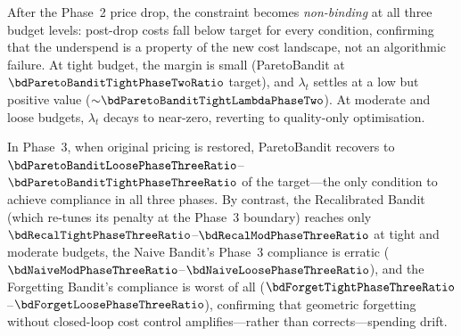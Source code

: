 After the Phase~2 price drop, the constraint becomes
\emph{non-binding} at all three budget levels: post-drop costs
fall below target for every condition, confirming that the
underspend is a property of the new cost landscape, not an
algorithmic failure.
At tight budget, the margin is small (ParetoBandit at
$\bdParetoBanditTightPhaseTwoRatio$ target), and $\lambda_t$
settles at a low but positive value
(${\sim}\bdParetoBanditTightLambdaPhaseTwo$).
At moderate and loose budgets, $\lambda_t$ decays to near-zero,
reverting to quality-only optimisation.

In Phase~3, when original pricing is restored, ParetoBandit
recovers to $\bdParetoBanditLoosePhaseThreeRatio$--$\bdParetoBanditTightPhaseThreeRatio$
of the target---the only condition to achieve compliance in all
three phases.  By contrast, the Recalibrated Bandit (which
re-tunes its penalty at the Phase~3 boundary) reaches only
$\bdRecalTightPhaseThreeRatio$--$\bdRecalModPhaseThreeRatio$ at
tight and moderate budgets, the Naive Bandit's Phase~3
compliance is erratic ($\bdNaiveModPhaseThreeRatio$--$\bdNaiveLoosePhaseThreeRatio$),
and the Forgetting Bandit's compliance is worst of all
($\bdForgetTightPhaseThreeRatio$--$\bdForgetLoosePhaseThreeRatio$),
confirming that geometric forgetting without closed-loop cost
control amplifies---rather than corrects---spending drift.

